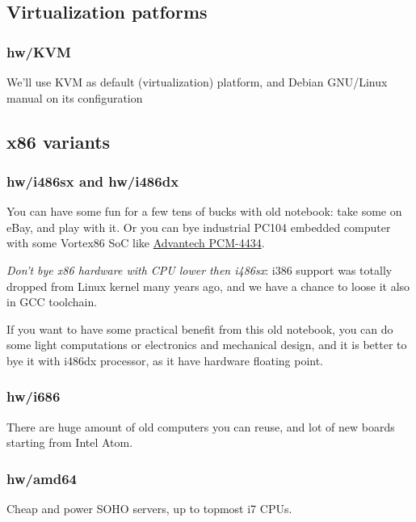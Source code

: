 \subsection{Virtualization patforms}

\subsubsection{hw/KVM}

We'll use KVM as default (virtualization) platform, and Debian GNU/Linux manual
on its configuration

\subsection{x86 variants}

\subsubsection{hw/i486sx and hw/i486dx}

You can have some fun for a few tens of bucks with old notebook: take some on
eBay, and play with it. Or you can bye industrial PC104 embedded computer with
some Vortex86 SoC like
\href{http://www.advantech.ru/products/1-2jkltu/pcm-3343/mod_645a1e17-167a-4476-b253-ca4cf2e19428}{Advantech PCM-4434}.

\emph{Don't bye x86 hardware with CPU lower then i486sx}: i386 support was
totally dropped from Linux kernel many years ago, and we have a chance to loose
it also in GCC toolchain.

If you want to have some practical benefit from this old notebook, you can do
some light computations or electronics and mechanical design, and it is better
to bye it with i486dx processor, as it have hardware floating point. 

\subsubsection{hw/i686}

There are huge amount of old computers you can reuse, and lot of new boards
starting from Intel Atom.

\subsubsection{hw/amd64}

Cheap and power SOHO servers, up to topmost i7 CPUs.

